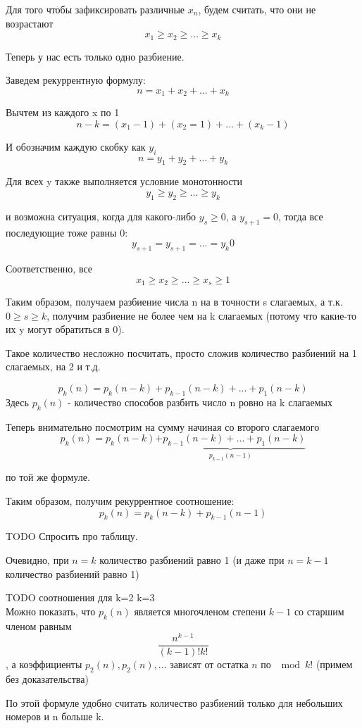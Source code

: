 Для того чтобы зафиксировать различные $x_n$, будем считать, что они не возрастают
$$
x_1 \ge x_2 \ge \ldots \ge x_k
$$

Теперь у нас есть только одно разбиение.

Заведем рекуррентную формулу:
$$
n = x_1 + x_2 + \ldots + x_k
$$

Вычтем из каждого x по 1
$$
n-k = (x_1 - 1) + (x_2 = 1) + \ldots + (x_k - 1)
$$

И обозначим каждую скобку как $y_i$
$$
n = y_1 + y_2 + \ldots + y_k
$$

Для всех y также выполняется условние монотонности
$$
y_1 \ge y_2 \ge \ldots \ge y_k
$$

и возможна ситуация, когда для какого-либо $y_s \ge 0$, а $y_{s+1} = 0$, тогда все последующие тоже равны 0:
$$
y_{s+1} = y_{s+1} = \ldots = y_k 0
$$

Соответственно, все 
$$
x_1 \ge x_2 \ge \ldots \ge x_s \ge 1
$$

Таким образом, получаем разбиение числа n на в точности s слагаемых, 
а т.к. $0 \ge s \ge k$, получим разбиение не более чем на k слагаемых (потому что какие-то их y могут обратиться в 0).

Такое количество несложно посчитать, просто сложив количество разбиений на 1 слагаемых, на 2 и т.д.

$$
p_k(n) = p_{k}(n-k) + p_{k-1}(n-k) + \ldots + p_{1}(n-k)
$$
Здесь $p_k(n)$ - количество способов разбить число n ровно на k слагаемых

Теперь внимательно посмотрим на сумму начиная со второго слагаемого
$$
p_k(n) = p_{k}(n-k) \underbrace{+ p_{k-1}(n-k) + \ldots + p_{1}(n-k)}_{p_{k-1}(n-1)}
$$

по той же формуле.

Таким образом, получим рекуррентное соотношение:
$$
p_k(n) = p_{k}(n-k) + p_{k-1}(n-1)
$$

TODO Спросить про таблицу.

Очевидно, при $n=k$ количество разбиений равно 1 (и даже при $n=k-1$ количество разбиений равно 1)

TODO соотношения для k=2 k=3 \\

Можно показать, что $p_k(n)$ является многочленом степени $k-1$ со старшим членом равным 
$$
\frac{n^{k-1}}{(k-1)!k!}
$$
, а коэффициенты $p_2(n), p_2(n), \ldots$ зависят от остатка $n$ по $ \mod k!$ (примем без доказательства)

По этой формуле удобно считать количество разбиений только для небольших номеров и n больше k.

